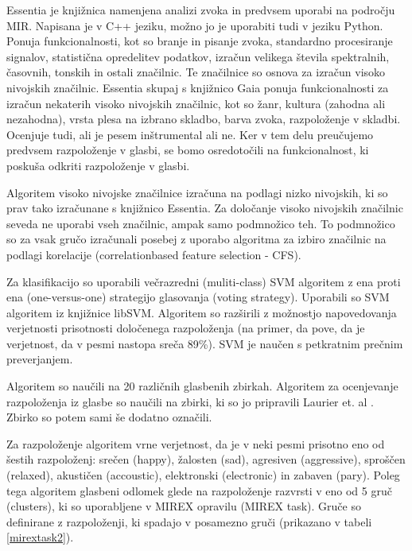 \documentclass[a4paper, 12pt]{book}
\begin{document}
{Essentia je knjižnica namenjena analizi zvoka in predvsem uporabi na področju MIR. Napisana je v C++ jeziku, možno jo je uporabiti tudi v jeziku Python. Ponuja funkcionalnosti, kot so branje in pisanje zvoka, standardno procesiranje signalov, statistična opredelitev podatkov, izračun velikega števila spektralnih, časovnih, tonskih in ostali značilnic. Te značilnice so osnova za izračun visoko nivojskih značilnic. Essentia skupaj s knjižnico Gaia ponuja funkcionalnosti za izračun nekaterih visoko nivojskih značilnic, kot so žanr, kultura (zahodna ali nezahodna), vrsta plesa na izbrano skladbo, barva zvoka, razpoloženje v skladbi. Ocenjuje tudi, ali je pesem inštrumental ali ne. Ker v tem delu preučujemo predvsem razpoloženje v glasbi, se bomo osredotočili na funkcionalnost, ki poskuša odkriti razpoloženje v glasbi.

Algoritem visoko nivojske značilnice izračuna na podlagi nizko nivojskih, ki so prav tako izračunane s knjižnico Essentia. Za določanje visoko nivojskih značilnic seveda ne uporabi vseh značilnic, ampak samo podmnožico teh. To podmnožico so za vsak gručo izračunali posebej z uporabo algoritma za izbiro značilnic na podlagi korelacije (correlationbased feature selection - CFS). 

Za klasifikacijo so uporabili večrazredni (muliti-class) SVM algoritem z ena proti ena (one-versus-one) strategijo glasovanja (voting strategy). Uporabili so SVM algoritem iz knjižnice libSVM. Algoritem so razširili z možnostjo napovedovanja verjetnosti prisotnosti določenega razpoloženja (na primer, da pove, da je verjetnost, da v pesmi nastopa sreča 89\%). SVM je naučen s petkratnim prečnim preverjanjem.  

Algoritem so naučili na 20 različnih glasbenih zbirkah. Algoritem za ocenjevanje razpoloženja iz glasbe so naučili na zbirki, ki so jo pripravili Laurier et. al \cite{Laurier2009}. Zbirko so potem sami še dodatno označili. 

Za razpoloženje algoritem vrne verjetnost, da je v neki pesmi prisotno eno od šestih razpoloženj: srečen (happy), žalosten (sad), agresiven (aggressive), sproščen (relaxed), akustičen (accoustic), elektronski (electronic) in zabaven (pary). Poleg tega algoritem glasbeni odlomek glede na razpoloženje razvrsti v eno od 5 gruč (clusters), ki so uporabljene v MIREX opravilu (MIREX task). Gruče so definirane z razpoloženji, ki spadajo v posamezno gruči (prikazano v tabeli \ref{mirextask2}). 

}
\end{document}
